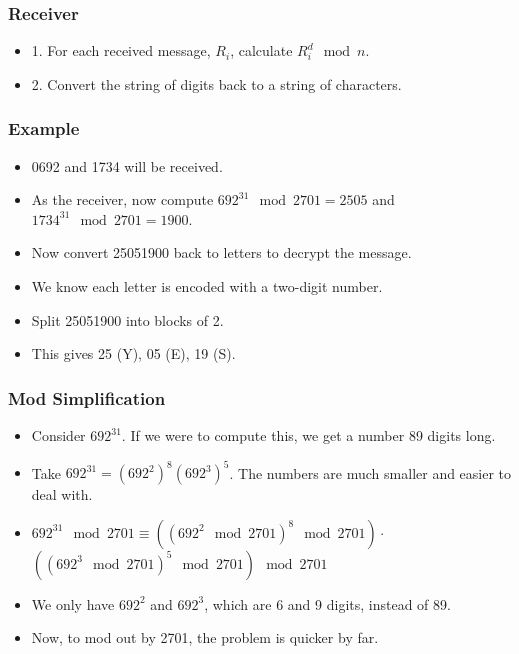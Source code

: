 \documentclass{beamer}
\begin{document}
\begin{frame}
\frametitle{Receiver}
\begin{itemize}
\item 1. For each received message, $R_i$, calculate $R_i^d \mod n$.
\item 2. Convert the string of digits back to a string of characters.
\end{itemize}
\end{frame}
\begin{frame}
\frametitle{Example}
\begin{itemize}
\item 0692 and 1734 will be received.
\item As the receiver, now compute $692^{31} \mod 2701=2505$ and $1734^{31} \mod 2701=1900$.
\item Now convert 25051900 back to letters to decrypt the message.
\item We know each letter is encoded with a two-digit number.
\item Split 25051900 into blocks of 2.
\item This gives 25 (Y), 05 (E), 19 (S). 
\end{itemize}
\end{frame}
\begin{frame}
\frametitle{Mod Simplification}
\begin{itemize}
\item Consider $692^{31}$. If we were to compute this, we get a number 89 digits long.
\item Take $692^{31}=(692^2)^{8} (692^3)^5$. The numbers are much smaller and easier to deal with. 
\item $692^{31} \mod 2701 \equiv ((692^2 \mod 2701)^8 \mod 2701)\cdot$ $((692^3 \mod 2701)^5 \mod 2701) \mod 2701 $
\item We only have $692^2$ and $692^3$, which are 6 and 9 digits, instead of 89. 
\item Now, to mod out by 2701, the problem is quicker by far.
\end{itemize}
\end{frame}
\end{document}
